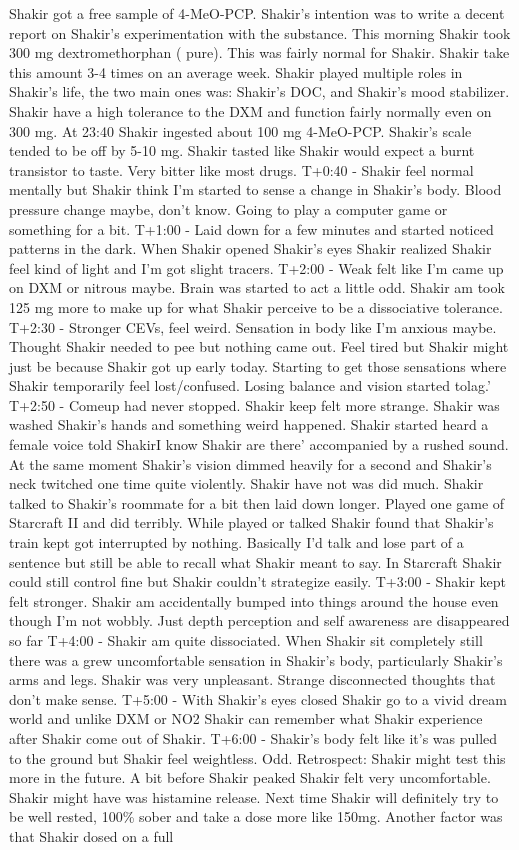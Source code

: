 \documentclass[12pt]{book}
\begin{document}
Shakir got a free sample of 4-MeO-PCP. Shakir's intention was to write a decent report on Shakir's experimentation with the substance. This morning Shakir took 300 mg dextromethorphan ( pure). This was fairly normal for Shakir. Shakir take this amount 3-4 times on an average week. Shakir played multiple roles in Shakir's life, the two main ones was: Shakir's DOC, and Shakir's mood stabilizer. Shakir have a high tolerance to the DXM and function fairly normally even on 300 mg. At 23:40 Shakir ingested about 100 mg 4-MeO-PCP. Shakir's scale tended to be off by 5-10 mg. Shakir tasted like Shakir would expect a burnt transistor to taste. Very bitter like most drugs. T+0:40 - Shakir feel normal mentally but Shakir think I'm started to sense a change in Shakir's body. Blood pressure change maybe, don't know. Going to play a computer game or something for a bit. T+1:00 - Laid down for a few minutes and started noticed patterns in the dark. When Shakir opened Shakir's eyes Shakir realized Shakir feel kind of light and I'm got slight tracers. T+2:00 - Weak felt like I'm came up on DXM or nitrous maybe. Brain was started to act a little odd. Shakir am took 125 mg more to make up for what Shakir perceive to be a dissociative tolerance. T+2:30 - Stronger CEVs, feel weird. Sensation in body like I'm anxious maybe. Thought Shakir needed to pee but nothing came out. Feel tired but Shakir might just be because Shakir got up early today. Starting to get those sensations where Shakir temporarily feel lost/confused. Losing balance and vision started tolag.' T+2:50 - Comeup had never stopped. Shakir keep felt more strange. Shakir was washed Shakir's hands and something weird happened. Shakir started heard a female voice told ShakirI know Shakir are there' accompanied by a rushed sound. At the same moment Shakir's vision dimmed heavily for a second and Shakir's neck twitched one time quite violently. Shakir have not was did much. Shakir talked to Shakir's roommate for a bit then laid down longer. Played one game of Starcraft II and did terribly. While played or talked Shakir found that Shakir's train kept got interrupted by nothing. Basically I'd talk and lose part of a sentence but still be able to recall what Shakir meant to say. In Starcraft Shakir could still control fine but Shakir couldn't strategize easily. T+3:00 - Shakir kept felt stronger. Shakir am accidentally bumped into things around the house even though I'm not wobbly. Just depth perception and self awareness are disappeared so far T+4:00 - Shakir am quite dissociated. When Shakir sit completely still there was a grew uncomfortable sensation in Shakir's body, particularly Shakir's arms and legs. Shakir was very unpleasant. Strange disconnected thoughts that don't make sense. T+5:00 - With Shakir's eyes closed Shakir go to a vivid dream world and unlike DXM or NO2 Shakir can remember what Shakir experience after Shakir come out of Shakir. T+6:00 - Shakir's body felt like it's was pulled to the ground but Shakir feel weightless. Odd. Retrospect: Shakir might test this more in the future. A bit before Shakir peaked Shakir felt very uncomfortable. Shakir might have was histamine release. Next time Shakir will definitely try to be well rested, 100\% sober and take a dose more like 150mg. Another factor was that Shakir dosed on a full 
\end{document}
